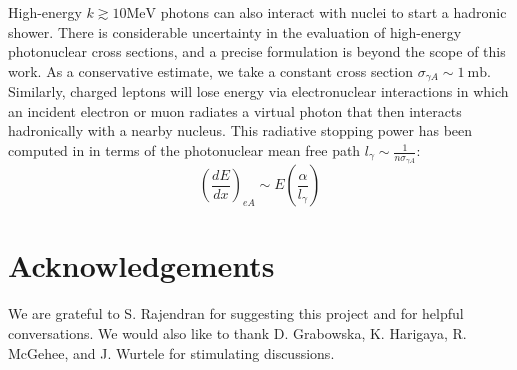 \documentclass[twocolumn,showpacs,preprintnumbers,amsmath,amssymb,prd]{revtex4}
\def\r{\right)}
\def\l{\left(}
\begin{document}
\begin{appendices}
High-energy $k \gtrsim 10 \text{MeV}$ photons can also interact with nuclei to start a hadronic shower. There is considerable uncertainty in the evaluation of high-energy photonuclear cross sections, and a precise formulation is beyond the scope of this work. As a conservative estimate, we take a constant cross section $\sigma_{\gamma A} \sim 1 ~\text{mb}$. Similarly, charged leptons will lose energy via electronuclear interactions in which an incident electron or muon radiates a virtual photon that then interacts hadronically with a nearby nucleus. This radiative stopping power has been computed in \cite{Gerhardt:2010bj} in terms of the photonuclear mean free path $l_\gamma \sim \frac{1}{n \sigma_{\gamma A}}$:
\begin{equation}
\l \frac{dE}{dx}\r_{eA} \sim E \l \frac{\alpha}{l_\gamma}\r
\end{equation}
\end{appendices}


\section*{Acknowledgements}
We are grateful to S. Rajendran for suggesting this project and for helpful conversations. We would also like to thank D. Grabowska, K. Harigaya, R. McGehee, and J. Wurtele for stimulating discussions.


\end{document}
